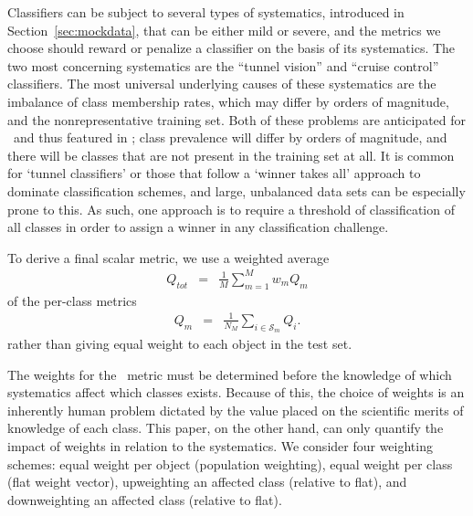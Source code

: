 Classifiers can be subject to several types of systematics, introduced in Section~\ref{sec:mockdata}, that can be either mild or severe, and the metrics we choose should reward or penalize a classifier on the basis of its systematics.
The two most concerning systematics are the ``tunnel vision'' and ``cruise control'' classifiers.
The most universal underlying causes of these systematics are the imbalance of class membership rates, which may differ by orders of magnitude, and the nonrepresentative training set.
Both of these problems are anticipated for \lsst\ and thus featured in \plasticc; class prevalence will differ by orders of magnitude, and there will be classes that are not present in the training set at all.
It is common for `tunnel classifiers' or those that follow a `winner takes all' approach to dominate classification schemes, and large, unbalanced data sets can be especially prone to this.
As such, one approach is to require a threshold of classification of all classes in order to assign a winner in any classification challenge.

To derive a final scalar metric, we use a weighted average
\begin{eqnarray}
Q_{tot} &=& \frac{1}{M}\sum_{m=1}^{M}w_{m}Q_{m}
\end{eqnarray}
of the per-class metrics
\begin{eqnarray}
Q_{m} &=& \frac{1}{N_{M}}\sum_{i\in\mathcal{S}_{m}}Q_{i}.
\end{eqnarray}
rather than giving equal weight to each object in the test set.

The weights for the \plasticc\ metric must be determined before the knowledge of which systematics affect which classes exists.
Because of this, the choice of weights is an inherently human problem dictated by the value placed on the scientific merits of knowledge of each class.
This paper, on the other hand, can only quantify the impact of weights in relation to the systematics.
We consider four weighting schemes: equal weight per object (population weighting), equal weight per class (flat weight vector), upweighting an affected class (relative to flat), and downweighting an affected class (relative to flat).
